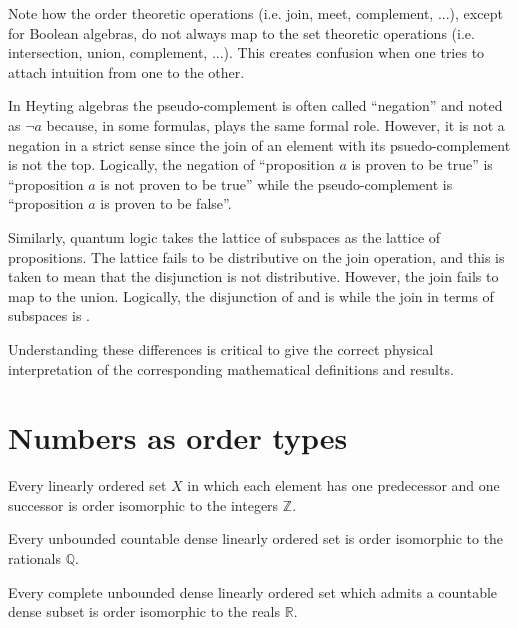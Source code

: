 \documentclass{article}
\begin{document}
\begin{remark}
	Note how the order theoretic operations (i.e. join, meet, complement, ...), except for Boolean algebras, do not always map to the set theoretic operations (i.e. intersection, union, complement, ...). This creates confusion when one tries to attach intuition from one to the other.	
	
	In Heyting algebras the pseudo-complement is often called ``negation'' and noted as $\neg a$ because, in some formulas, plays the same formal role. However, it is not a negation in a strict sense since the join of an element with its psuedo-complement is not the top. Logically, the negation of ``proposition $a$ is proven to be true'' is ``proposition $a$ is not proven to be true'' while the pseudo-complement is ``proposition $a$ is proven to be false''.
	
	Similarly, quantum logic takes the lattice of subspaces as the lattice of propositions. The lattice fails to be distributive on the join operation, and this is taken to mean that the disjunction is not distributive. However, the join fails to map to the union. Logically, the disjunction of  and  is  while the join in terms of subspaces is .
	
	Understanding these differences is critical to give the correct physical interpretation of the corresponding mathematical definitions and results.
	
\end{remark}

\section{Numbers as order types}

\begin{prop}
	Every linearly ordered set $X$ in which each element has one predecessor and one successor is order isomorphic to the integers $\mathbb{Z}$.
\end{prop}

\begin{prop}
	 Every unbounded countable dense linearly ordered set is order isomorphic to the rationals $\mathbb{Q}$.
\end{prop}

\begin{prop}
	Every complete unbounded dense linearly ordered set which admits a countable dense subset is order isomorphic to the reals $\mathbb{R}$.
\end{prop}




\end{document}
